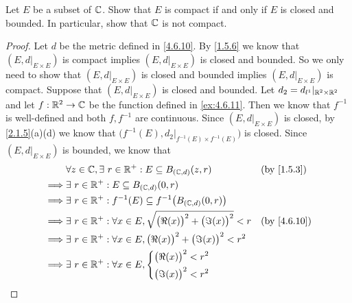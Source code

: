 \begin{ex}\label{ex:4.6.13}
  Let \(E\) be a subset of \(\mathbb{C}\).
  Show that \(E\) is compact if and only if \(E\) is closed and bounded.
  In particular, show that \(\mathbb{C}\) is not compact.
\end{ex}

\begin{proof}
  Let \(d\) be the metric defined in \cref{4.6.10}.
  By \cref{1.5.6} we know that \((E, d|_{E \times E})\) is compact implies \((E, d|_{E \times E})\) is closed and bounded.
  So we only need to show that \((E, d|_{E \times E})\) is closed and bounded implies \((E, d|_{E \times E})\) is compact.
  Suppose that \((E, d|_{E \times E})\) is closed and bounded.
  Let \(d_2 = d_{l^1}|_{\mathbb{R}^2 \times \mathbb{R}^2}\) and let \(f : \mathbb{R}^2 \to \mathbb{C}\) be the function defined in \cref{ex:4.6.11}.
  Then we know that \(f^{-1}\) is well-defined and both \(f, f^{-1}\) are continuous.
  Since \((E, d|_{E \times E})\) is closed, by \cref{2.1.5}(a)(d) we know that \(\big(f^{-1}(E), d_2|_{f^{-1}(E) \times f^{-1}(E)}\big)\) is closed.
  Since \((E, d|_{E \times E})\) is bounded, we know that
  \begin{align*}
             & \forall z \in \C, \exists\ r \in \R^+ : E \subseteq B_{(\C, d)}(z, r)                     &  & \text{(by \cref{1.5.3})}  \\
    \implies & \exists\ r \in \R^+ : E \subseteq B_{(\C, d)}(0, r)                                                                      \\
    \implies & \exists\ r \in \R^+ : f^{-1}(E) \subseteq f^{-1}\big(B_{(\C, d)}(0, r)\big)                                              \\
    \implies & \exists\ r \in \R^+ : \forall x \in E, \sqrt{\big(\Re(x)\big)^2 + \big(\Im(x)\big)^2} < r &  & \text{(by \cref{4.6.10})} \\
    \implies & \exists\ r \in \R^+ : \forall x \in E, \big(\Re(x)\big)^2 + \big(\Im(x)\big)^2 < r^2                                     \\
    \implies & \exists\ r \in \R^+ : \forall x \in E, \begin{dcases}
                                                        \big(\Re(x)\big)^2 < r^2 \\
                                                        \big(\Im(x)\big)^2 < r^2
                                                      \end{dcases}                                                          \\

\end{align*}
\end{proof}

